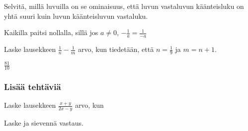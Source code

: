 \begin{tehtava}
Selvitä, millä luvuilla on se ominaisuus, että luvun vastaluvun käänteisluku on yhtä suuri kuin luvun käänteisluvun vastaluku.
	\begin{vastaus}
Kaikilla paitsi nollalla, sillä jos $a \neq 0$, $-\frac{1}{a} = \frac{1}{-a}$
	\end{vastaus}
\end{tehtava}

\begin{tehtava}
	Laske lausekkeen $\frac{1}{n}-\frac{1}{m}$ arvo, kun tiedetään, että $n = \frac{1}{9}$ ja $m=n+1$.
	\begin{vastaus}
		$\frac{81}{10}$
	\end{vastaus}
\end{tehtava}


\subsubsection*{Lisää tehtäviä}

\begin{tehtava}
Laske lausekkeen $\frac{x+y}{2x-y}$ arvo, kun
\begin{vastaus}
\end{vastaus}
\end{tehtava}
 
\begin{tehtava}
Laske ja sievennä vastaus.
            \begin{vastaus}
            \end{vastaus}
\end{tehtava}
        
\begin{tehtava}
            \begin{vastaus}		
            \end{vastaus}
\end{tehtava}
        
